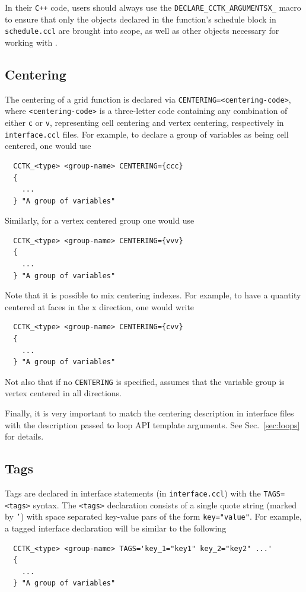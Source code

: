 In their \texttt{C++} code, users should always use the \texttt{DECLARE\_CCTK\_ARGUMENTSX\_<scheduled function name>} macro to ensure that only the objects declared in the function's schedule block in \texttt{schedule.ccl} are brought into scope, as well as other objects necessary for working with \CarpetX.

 \subsection{Centering}

The centering of a grid function is declared via \texttt{CENTERING={<centering-code>}}, where \texttt{<centering-code>} is a three-letter code containing any combination of either \texttt{c} or \texttt{v}, representing cell centering and vertex centering, respectively in \texttt{interface.ccl} files. For example, to declare a group of variables as being cell centered, one would use
%
\begin{verbatim}
  CCTK_<type> <group-name> CENTERING={ccc}
  {
    ...
  } "A group of variables"
\end{verbatim}

Similarly, for a vertex centered group one would use
%
\begin{verbatim}
  CCTK_<type> <group-name> CENTERING={vvv}
  {
    ...
  } "A group of variables"
\end{verbatim}

Note that it is possible to mix centering indexes. For example, to have a quantity centered at faces in the x direction, one would write
%
\begin{verbatim}
  CCTK_<type> <group-name> CENTERING={cvv}
  {
    ...
  } "A group of variables"
\end{verbatim}

Not also that if no \texttt{CENTERING} is specified, \CarpetX\space assumes that the variable group is vertex centered in all directions.

Finally, it is very important to match the centering description in interface files with the description passed to loop API template arguments. See Sec.~\ref{sec:loops} for details.

\subsection{Tags}
\label{sec:tags}

Tags are declared in interface statements (in \texttt{interface.ccl}) with the \texttt{TAGS=<tags>} syntax. The \texttt{<tags>} declaration consists of a single quote string (marked by \texttt{'}) with space separated key-value pars of the form \texttt{key="value"}. For example, a tagged interface declaration will be similar to the following
%
\begin{verbatim}
  CCTK_<type> <group-name> TAGS='key_1="key1" key_2="key2" ...'
  {
    ...
  } "A group of variables"
\end{verbatim}

